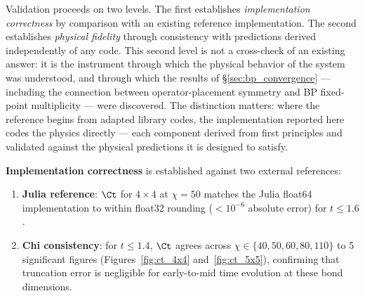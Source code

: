 Validation proceeds on two levels.
The first establishes \emph{implementation correctness} by comparison with an
existing reference implementation.
The second establishes \emph{physical fidelity} through consistency with
predictions derived independently of any code.
This second level is not a cross-check of an existing answer: it is the
instrument through which the physical behavior of the system was understood,
and through which the results of \S\ref{sec:bp_convergence} --- including the
connection between operator-placement symmetry and BP fixed-point multiplicity
--- were discovered.
The distinction matters: where the reference begins from adapted library codes,
the implementation reported here codes the physics directly --- each component
derived from first principles and validated against the physical predictions it
is designed to satisfy.

\medskip
\noindent\textbf{Implementation correctness} is established against two external references:
\begin{enumerate}
  \item \textbf{Julia reference}: $\Ct$ for $4\times4$ at $\chi=50$ matches the
        Julia float64 implementation to within float32 rounding
        ($<10^{-6}$ absolute error) for $t \leq 1.6$.
  \item \textbf{Chi consistency}: for $t \leq 1.4$, $\Ct$ agrees across
        $\chi \in \{40, 50, 60, 80, 110\}$ to 5 significant figures
        (Figures~\ref{fig:ct_4x4} and~\ref{fig:ct_5x5}), confirming that truncation error is negligible
        for early-to-mid time evolution at these bond dimensions.
\end{enumerate}

